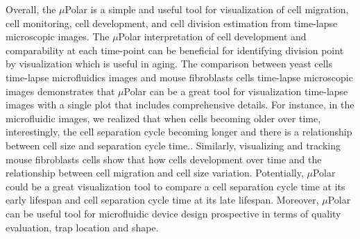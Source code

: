 \documentclass[conference]{IEEEtran}
\begin{document}
Overall, the $\mu$Polar is a simple and useful tool for visualization of cell migration, cell monitoring, cell development, and cell division estimation from time-lapse microscopic images. The $\mu$Polar interpretation of cell development and comparability at each time-point can be beneficial for identifying division point by visualization which is useful in aging. The comparison between yeast cells time-lapse microfluidics images and mouse fibroblasts cells time-lapse microscopic images demonstrates that $\mu$Polar can be a great tool for visualization time-lapse images with a single plot that includes comprehensive details. For instance, in the microfluidic images, we realized that when cells becoming older over time, interestingly, the cell separation cycle becoming longer and there is a relationship between cell size and separation cycle time.. Similarly, visualizing and tracking mouse fibroblasts cells show that  how cells development over time  and the relationship between cell migration and cell size variation. Potentially, $\mu$Polar could be a great visualization tool to compare a cell separation cycle time at its early lifespan and cell separation cycle time at its late lifespan. Moreover, $\mu$Polar can be useful tool for microfluidic device design prospective  in terms of quality evaluation, trap location and shape. 





 
\end{document}
